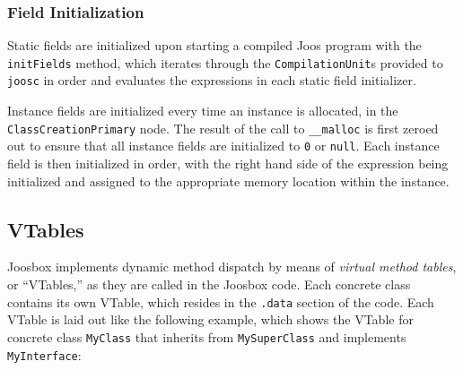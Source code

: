 \documentclass[letterpaper]{article}
\begin{document}
  \subsubsection{Field Initialization}

  Static fields are initialized upon starting a compiled Joos program with the
  {\tt initFields} method, which iterates through the {\tt CompilationUnit}s
  provided to {\tt joosc} in order and evaluates the expressions in each
  static field initializer.

  Instance fields are initialized every time an instance is allocated, in the
  {\tt ClassCreationPrimary} node. The result of the call to {\tt \_\_malloc}
  is first zeroed out to ensure that all instance fields are initialized to
  {\tt 0} or {\tt null}. Each instance field is then initialized in order,
  with the right hand side of the expression being initialized and assigned to
  the appropriate memory location within the instance.

  \subsection{VTables}

  Joosbox implements dynamic method dispatch by means of {\em virtual method
  tables}, or ``VTables,'' as they are called in the Joosbox code. Each
  concrete class contains its own VTable, which resides in the {\tt .data}
  section of the code. Each VTable is laid out like the following example,
  which shows the VTable for concrete class {\tt MyClass} that inherits from
  {\tt MySuperClass} and implements {\tt MyInterface}:
\end{document}
